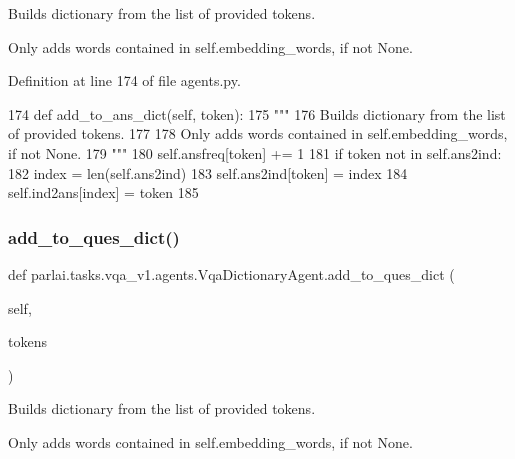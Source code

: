 \begin{DoxyVerb}Builds dictionary from the list of provided tokens.

Only adds words contained in self.embedding_words, if not None.
\end{DoxyVerb}
 

Definition at line 174 of file agents.\+py.


\begin{DoxyCode}
174     \textcolor{keyword}{def }add\_to\_ans\_dict(self, token):
175         \textcolor{stringliteral}{"""}
176 \textcolor{stringliteral}{        Builds dictionary from the list of provided tokens.}
177 \textcolor{stringliteral}{}
178 \textcolor{stringliteral}{        Only adds words contained in self.embedding\_words, if not None.}
179 \textcolor{stringliteral}{        """}
180         self.ansfreq[token] += 1
181         \textcolor{keywordflow}{if} token \textcolor{keywordflow}{not} \textcolor{keywordflow}{in} self.ans2ind:
182             index = len(self.ans2ind)
183             self.ans2ind[token] = index
184             self.ind2ans[index] = token
185 
\end{DoxyCode}
\mbox{\label{classparlai_1_1tasks_1_1vqa__v1_1_1agents_1_1VqaDictionaryAgent_aebfab302e4b8b2b4ac74723a047cca18}} 
\subsubsection{\texorpdfstring{add\+\_\+to\+\_\+ques\+\_\+dict()}{add\_to\_ques\_dict()}}
{\footnotesize\ttfamily def parlai.\+tasks.\+vqa\+\_\+v1.\+agents.\+Vqa\+Dictionary\+Agent.\+add\+\_\+to\+\_\+ques\+\_\+dict (\begin{DoxyParamCaption}\item[{}]{self,  }\item[{}]{tokens }\end{DoxyParamCaption})}

\begin{DoxyVerb}Builds dictionary from the list of provided tokens.

Only adds words contained in self.embedding_words, if not None.
\end{DoxyVerb}
 


